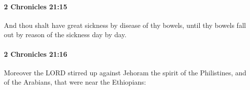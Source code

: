 		\paragraph{2 Chronicles 21:15} %
			\label{2CHRONICLES-21-15}

			And thou shalt have great sickness by disease of thy bowels, until thy bowels fall out by reason of the sickness day by day.


		\paragraph{2 Chronicles 21:16} %
			\label{2CHRONICLES-21-16}

			Moreover the LORD stirred up against Jehoram the spirit of the Philistines, and of the Arabians, that were near the Ethiopians:


